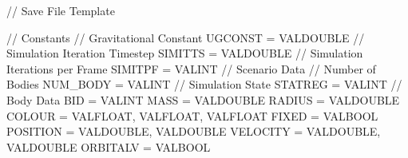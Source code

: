 // Save File Template

// Constants
// Gravitational Constant
UGCONST = VALDOUBLE
// Simulation Iteration Timestep
SIMITTS = VALDOUBLE
// Simulation Iterations per Frame
SIMITPF = VALINT
// Scenario Data
// Number of Bodies
NUM_BODY = VALINT
// Simulation State
STATREG = VALINT
// Body Data
BID = VALINT {
  MASS     = VALDOUBLE
  RADIUS   = VALDOUBLE
  COLOUR   = VALFLOAT, VALFLOAT, VALFLOAT
  FIXED    = VALBOOL
  POSITION = VALDOUBLE, VALDOUBLE
  VELOCITY = VALDOUBLE, VALDOUBLE
  ORBITALV = VALBOOL
}